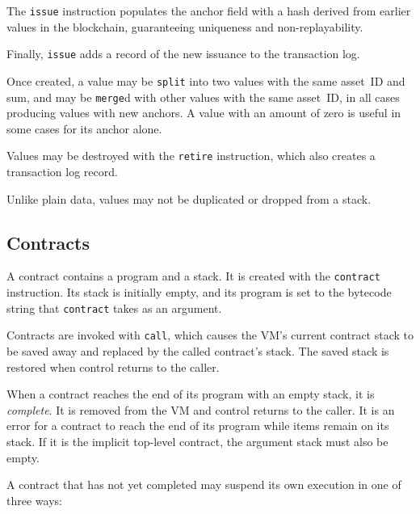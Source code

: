 \documentclass{article}
\begin{document}
The \texttt{issue} instruction populates the anchor field with a hash
derived from earlier values in the blockchain, guaranteeing uniqueness
and non-replayability.

Finally, \texttt{issue} adds a record of the new issuance to the
transaction log.

Once created, a value may be \texttt{split} into two values with the
same asset~ID and sum, and may be \texttt{merge}d with other values
with the same asset~ID, in all cases producing values with new
anchors. A value with an amount of zero is useful in some cases for
its anchor alone.

Values may be destroyed with the \texttt{retire} instruction, which
also creates a transaction log record.

Unlike plain data, values may not be duplicated or dropped from a
stack.

\subsection{Contracts}

A contract contains a program and a stack. It is created with the
\texttt{contract} instruction. Its stack is initially empty, and its
program is set to the bytecode string that \texttt{contract} takes as
an argument.

Contracts are invoked with \texttt{call}, which causes the VM's
current contract stack to be saved away and replaced by the called
contract's stack. The saved stack is restored when control returns to
the caller.

When a contract reaches the end of its program with an empty stack, it
is \textit{complete}. It is removed from the VM and control returns to
the caller. It is an error for a contract to reach the
end of its program while items remain on its stack. If it is the implicit top-level contract, the argument
stack must also be empty.

A contract that has not yet completed may suspend its own execution in
one of three ways:
\end{document}
